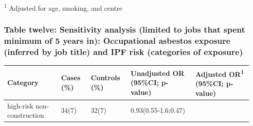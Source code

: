 \documentclass[
]{article}
\begin{document}
\textsuperscript{1} Adjusted for age, smoking, and centre

\hypertarget{table-twelve-sensitivity-analysis-limited-to-jobs-that-spent-minimum-of-5-years-in-occupational-asbestos-exposure-inferred-by-job-title-and-ipf-risk-categories-of-exposure}{%
\subsubsection{Table twelve: Sensitivity analysis (limited to jobs that
spent minimum of 5 years in): Occupational asbestos exposure (inferred
by job title) and IPF risk (categories of
exposure)}\label{table-twelve-sensitivity-analysis-limited-to-jobs-that-spent-minimum-of-5-years-in-occupational-asbestos-exposure-inferred-by-job-title-and-ipf-risk-categories-of-exposure}}

\begin{longtable}[]{@{}lllll@{}}
\toprule
\begin{minipage}[b]{0.20\columnwidth}\raggedright
Category\strut
\end{minipage} & \begin{minipage}[b]{0.08\columnwidth}\raggedright
Cases (\%)\strut
\end{minipage} & \begin{minipage}[b]{0.10\columnwidth}\raggedright
Controls (\%)\strut
\end{minipage} & \begin{minipage}[b]{0.24\columnwidth}\raggedright
Unadjusted OR (95\%CI; p-value)\strut
\end{minipage} & \begin{minipage}[b]{0.23\columnwidth}\raggedright
Adjusted OR\textsuperscript{1} (95\%CI; p-value)\strut
\end{minipage}\tabularnewline
\midrule
\endhead
\begin{minipage}[t]{0.20\columnwidth}\raggedright
high-risk non-construction\strut
\end{minipage} & \begin{minipage}[t]{0.08\columnwidth}\raggedright
34(7)\strut
\end{minipage} & \begin{minipage}[t]{0.10\columnwidth}\raggedright
32(7)\strut
\end{minipage} & \begin{minipage}[t]{0.24\columnwidth}\raggedright
0.93(0.55-1.6;0.47)\strut
\end{minipage} & \begin{minipage}[t]{0.23\columnwidth}\raggedright

\end{minipage}
\end{longtable}
\end{document}
